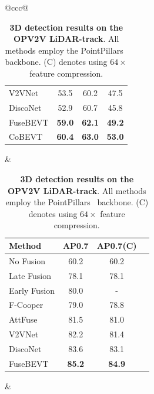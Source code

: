 \documentclass{article}
\begin{document}
{\begin{table}[!t]
\begin{tabular}{@{}ccc@{}}
\begin{minipage}[t]{0.34\textwidth}
\begin{tabular}{l|ccc}
 V2VNet~\cite{wang2020v2vnet} & 53.5 &60.2 & 47.5 \\  
 DiscoNet~\cite{li2021learning} & 52.9 & 60.7 & 45.8\\ \hline
 FuseBEVT & \textbf{59.0} &\textbf{62.1} & \textbf{49.2}\\
 CoBEVT & \textbf{60.4} & \textbf{63.0} & \textbf{53.0}\\
\end{tabular}
\end{minipage}
&
\begin{minipage}[t]{0.31\textwidth}
\centering
\setlength{\tabcolsep}{2.5pt}
\renewcommand{\arraystretch}{1.}
\caption{\textbf{3D detection results on the OPV2V LiDAR-track}. All methods employ the PointPillars~\cite{lang2019pointpillars} backbone. (C) denotes using $64\times$ feature compression.}
\label{tab:lidar}
\begin{tabular}{l|ccc}
\cellcolor{lightgray}Method & \cellcolor{lightgray}AP0.7 & \cellcolor{lightgray}AP0.7(C) \\
\toprule
No Fusion        & 60.2   & 60.2           \\ \hline
Late Fusion & 78.1 & 78.1 \\
Early Fusion & 80.0 & - \\
F-Cooper        & 79.0    & 78.8           \\
AttFuse      & 81.5   & 81.0       \\
V2VNet & 82.2    & 81.4          \\
DiscoNet    & 83.6   & 83.1           \\  \hline
FuseBEVT       & \textbf{85.2}    & \textbf{84.9}         \\ 
\end{tabular}
\end{minipage}
&


\end{tabular}
\end{table}}
\end{document}
